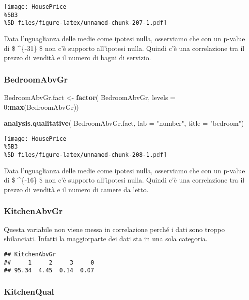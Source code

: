 \documentclass[
]{article}
\newenvironment{Shaded}{\begin{snugshade}}{\end{snugshade}}
\newcommand{\AttributeTok}[1]{\textcolor[rgb]{0.13,0.29,0.53}{#1}}
\newcommand{\DecValTok}[1]{\textcolor[rgb]{0.00,0.00,0.81}{#1}}
\newcommand{\FunctionTok}[1]{\textcolor[rgb]{0.13,0.29,0.53}{\textbf{#1}}}
\newcommand{\NormalTok}[1]{#1}
\newcommand{\OtherTok}[1]{\textcolor[rgb]{0.56,0.35,0.01}{#1}}
\newcommand{\SpecialCharTok}[1]{\textcolor[rgb]{0.81,0.36,0.00}{\textbf{#1}}}
\newcommand{\StringTok}[1]{\textcolor[rgb]{0.31,0.60,0.02}{#1}}
\begin{document}
\texttt{[image: HousePrice\\\%5B3\\\%5D\_files/figure-latex/unnamed-chunk-207-1.pdf]}

Data l'uguaglianza delle medie come ipotesi nulla, osserviamo che con un
p-value di \$ \^{}\{-31\} \$ non c'è supporto all'ipotesi
nulla. Quindi c'è una correlazione tra il prezzo di vendità e il numero
di bagni di servizio.

\subsubsection{BedroomAbvGr}\label{bedroomabvgr-1}

\begin{Shaded}
\begin{Highlighting}[]
\NormalTok{BedroomAbvGr.fact }\OtherTok{\textless{}{-}} \FunctionTok{factor}\NormalTok{(}
\NormalTok{    BedroomAbvGr,}
    \AttributeTok{levels =} \DecValTok{0}\SpecialCharTok{:}\FunctionTok{max}\NormalTok{(BedroomAbvGr))}

\FunctionTok{analysis.qualitative}\NormalTok{(}
\NormalTok{    BedroomAbvGr.fact,}
    \AttributeTok{lab =} \StringTok{"number"}\NormalTok{,}
    \AttributeTok{title =} \StringTok{"bedroom"}\NormalTok{)}
\end{Highlighting}
\end{Shaded}

\texttt{[image: HousePrice\\\%5B3\\\%5D\_files/figure-latex/unnamed-chunk-208-1.pdf]}

Data l'uguaglianza delle medie come ipotesi nulla, osserviamo che con un
p-value di \$ \^{}\{-16\} \$ non c'è supporto all'ipotesi
nulla. Quindi c'è una correlazione tra il prezzo di vendità e il numero
di camere da letto.

\subsubsection{KitchenAbvGr}\label{kitchenabvgr-1}

Questa variabile non viene messa in correlazione perché i dati sono
troppo sbilanciati. Infatti la maggiorparte dei dati sta in una sola
categoria.

\begin{verbatim}
## KitchenAbvGr
##     1     2     3     0 
## 95.34  4.45  0.14  0.07
\end{verbatim}

\subsubsection{KitchenQual}\label{kitchenqual}
\end{document}
